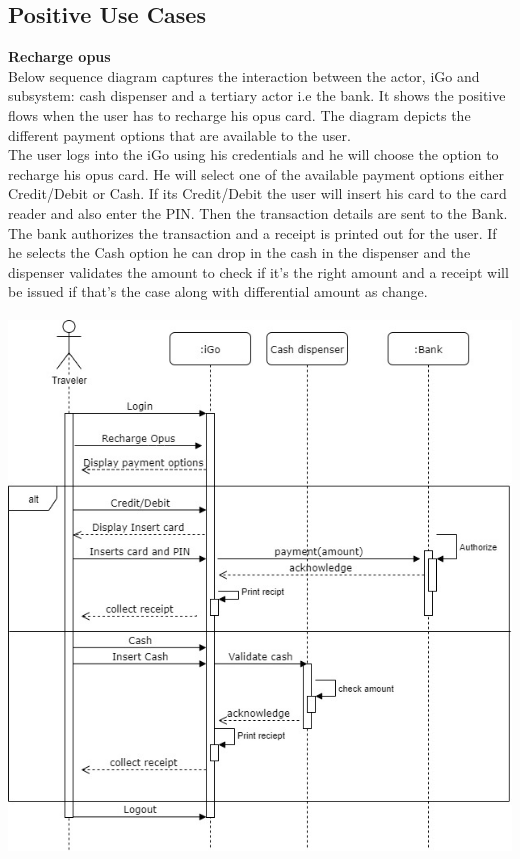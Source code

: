 \documentclass[a4paper, 11pt]{report}
\begin{document}
{\subsection{Positive Use Cases}
\large{\textbf{Recharge opus}}\\
Below sequence diagram captures the interaction between the actor, iGo and subsystem: cash dispenser and a tertiary actor i.e the bank. It shows the positive flows when the user has to recharge his opus card. The diagram depicts the different payment options that are available to the user.\\
The user logs into the iGo using his credentials and he will choose the option to recharge his opus card. He will select one of the available payment options either Credit/Debit or Cash. If its Credit/Debit the user will insert his card to the card reader and also enter the PIN. Then the transaction details are sent to the Bank. The bank authorizes the transaction and a receipt is printed out for the user. If he selects the Cash option he can drop in the cash in the dispenser and the dispenser validates the amount to check if it's the right amount and a receipt will be issued if that's the case along with differential amount as change.\\
 \includegraphics[width=150mm,height=150mm,scale=0.5]
{SequenceDiagram_Recharge.jpg}

}
\end{document}
